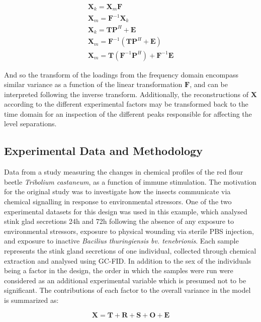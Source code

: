 \documentclass[preprint,12pt]{elsarticle}
\begin{document}
\begin{align}
    \mathbf{X}_k = \mathbf{X}_m\mathbf{F}\\
    \mathbf{X}_m = \mathbf{F}^{-1}\mathbf{X}_k\\
    \mathbf{X}_k = \mathbf{T}\mathbf{P}^H + \mathbf{E}\\
    \mathbf{X}_m = \mathbf{F}^{-1}\left(\mathbf{T}\mathbf{P}^H + \mathbf{E}\right)\\
    \mathbf{X}_m = \mathbf{T}\left(\mathbf{F}^{-1}\mathbf{P}^H\right) + \mathbf{F}^{-1}\mathbf{E}
\end{align}

And so the transform of the loadings from the frequency domain encompass similar variance as a function of the linear transformation $\mathbf{F}$, and can be interpreted following the inverse transform. Additionally, the reconstructions of $\mathbf{X}$ according to the different experimental factors may be transformed back to the time domain for an inspection of the different peaks responsible for affecting the level separations.
 
\subsection{Experimental Data and Methodology}

Data from a study measuring the changes in chemical profiles of the red flour beetle \textit{Tribolium castaneum}, as a function of immune stimulation. The motivation for the original study \cite{lo2023immune} was to investigate how the insects communicate via chemical signalling in response to environmental stressors. One of the two experimental datasets for this design was used in this example, which analysed stink glad secretions 24h and 72h following the absence of any exposure to environmental stressors, exposure to physical wounding via sterile PBS injection, and exposure to inactive \textit{Bacilius thuringiensis bv. tenebrionis}. Each sample represents the stink gland secretions of one individual, collected through chemical extraction and analysed using GC-FID. In addition to the sex of the individuals being a factor in the design, the order in which the samples were run were considered as an additional experimental variable which is presumed not to be significant. The contributions of each factor to the overall variance in the model is summarized as:

\begin{equation}\label{eq:GLM}
    \mathbf{X} = \mathbf{T} + \mathbf{R} + \mathbf{S} + \mathbf{O} + \mathbf{E}
\end{equation}
\end{document}

